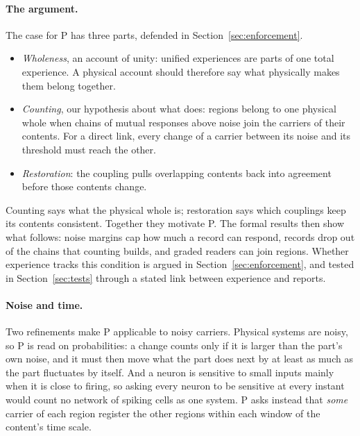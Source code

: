 \documentclass[12pt]{article}
\begin{document}
\paragraph{The argument.} The case for P has three parts, defended in
Section~\ref{sec:enforcement}.
\begin{itemize}
\item \emph{Wholeness}, an account of unity: unified experiences are parts of one
total experience. A physical account should therefore say what physically makes
them belong together.
\item \emph{Counting}, our hypothesis about what does: regions belong to one
physical whole when chains of mutual responses above noise join the carriers of
their contents. For a direct link, every change of a carrier between its noise
and its threshold must reach the other.
\item \emph{Restoration}: the coupling pulls overlapping contents back into
agreement before those contents change.
\end{itemize}
Counting says what the physical whole is; restoration says which couplings keep
its contents consistent. Together they motivate P. The formal results then show
what follows: noise margins cap how much a record can respond, records drop out
of the chains that counting builds, and graded readers can join regions.
Whether experience tracks this condition is argued in
Section~\ref{sec:enforcement}, and tested in Section~\ref{sec:tests} through a
stated link between experience and reports.

\paragraph{Noise and time.} Two refinements make P applicable to noisy carriers. Physical
systems are noisy, so P is read on probabilities: a change counts only if it is
larger than the part's own noise, and it must then move what the part does next
by at least as much as the part fluctuates by itself. And a neuron is sensitive
to small inputs mainly when it is close to firing, so asking every neuron to be
sensitive at every instant would count no network of spiking cells as one system.
P asks instead that \emph{some} carrier of each region register the other
regions within each window of the content's time scale.
\end{document}
